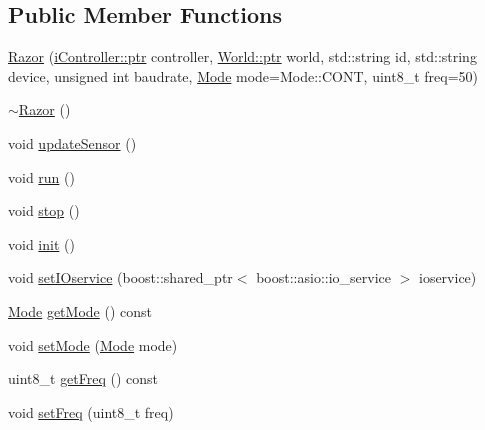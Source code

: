 \subsection*{Public Member Functions}
\begin{DoxyCompactItemize}
\item 
\hyperlink{classo_cpt_1_1components_1_1sensors_1_1_razor_a0434b265af592450a1acef4a95765575}{Razor} (\hyperlink{classo_cpt_1_1i_controller_a6d89a95cd6ad68bb74adfaca2f36370f}{i\+Controller\+::ptr} controller, \hyperlink{classo_cpt_1_1_world_aa6e591e3096d5de71e0cec9039663d67}{World\+::ptr} world, std\+::string id, std\+::string device, unsigned int baudrate, \hyperlink{classo_cpt_1_1components_1_1sensors_1_1_razor_afed258e485aaaf9193a57d649ccb159b}{Mode} mode=Mode\+::\+C\+O\+NT, uint8\+\_\+t freq=50)
\item 
\hyperlink{classo_cpt_1_1components_1_1sensors_1_1_razor_ae77b23479f6e7b52ed25c9989a0f1903}{$\sim$\+Razor} ()
\item 
void \hyperlink{classo_cpt_1_1components_1_1sensors_1_1_razor_ac8ee1582eb5c478c73e5e050858d2d7d}{update\+Sensor} ()
\item 
void \hyperlink{classo_cpt_1_1components_1_1sensors_1_1_razor_ad93891ffb2d47e56d1417f0a40026c6e}{run} ()
\item 
void \hyperlink{classo_cpt_1_1components_1_1sensors_1_1_razor_a807441c137892ee3c1b612c284893fa1}{stop} ()
\item 
void \hyperlink{classo_cpt_1_1components_1_1sensors_1_1_razor_a1dd2b5a9fbac3c9510e2d3771abf358b}{init} ()
\item 
void \hyperlink{classo_cpt_1_1components_1_1sensors_1_1_razor_a0f251fe3b51bf1a96b5d1e14e69a6d57}{set\+I\+Oservice} (boost\+::shared\+\_\+ptr$<$ boost\+::asio\+::io\+\_\+service $>$ ioservice)
\item 
\hyperlink{classo_cpt_1_1components_1_1sensors_1_1_razor_afed258e485aaaf9193a57d649ccb159b}{Mode} \hyperlink{classo_cpt_1_1components_1_1sensors_1_1_razor_ae9d8191555b521ee02cc26e387c900b1}{get\+Mode} () const
\item 
void \hyperlink{classo_cpt_1_1components_1_1sensors_1_1_razor_a25a3159510e0b725eaf817b8775420ac}{set\+Mode} (\hyperlink{classo_cpt_1_1components_1_1sensors_1_1_razor_afed258e485aaaf9193a57d649ccb159b}{Mode} mode)
\item 
uint8\+\_\+t \hyperlink{classo_cpt_1_1components_1_1sensors_1_1_razor_aefaf1327348e3e3b9717c40d7aa741c2}{get\+Freq} () const
\item 
void \hyperlink{classo_cpt_1_1components_1_1sensors_1_1_razor_a77cdeb877826fce3a12fec0ed3035478}{set\+Freq} (uint8\+\_\+t freq)
\end{DoxyCompactItemize}
